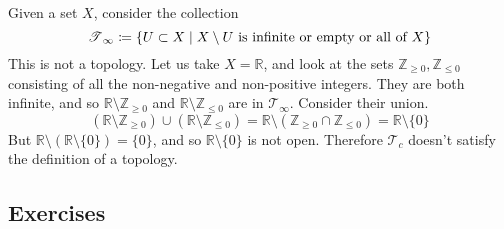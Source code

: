   \begin{example}
    Given a set $X$, consider the collection 
    \begin{equation}
      \T_\infty \coloneqq \{U \subset X \mid X \setminus U \text{ is infinite or empty or all of }X \}
    \end{equation}
    This is not a topology. Let us take $X = \mathbb{R}$, and look at the sets $\mathbb{Z}_{\geq 0}, \mathbb{Z}_{\leq 0}$ consisting of all the non-negative and non-positive integers. They are both infinite, and so $\mathbb{R} \setminus \mathbb{Z}_{\geq 0}$ and $\mathbb{R} \setminus \mathbb{Z}_{\leq 0}$ are in $\mathcal{T}_\infty$. Consider their union. 
    \begin{equation}
      (\mathbb{R} \setminus \mathbb{Z}_{\geq 0}) \cup (\mathbb{R} \setminus \mathbb{Z}_{\leq 0}) = \mathbb{R} \setminus (\mathbb{Z}_{\geq 0} \cap \mathbb{Z}_{\leq 0}) = \mathbb{R} \setminus \{0\}
    \end{equation}
    But $\mathbb{R} \setminus (\mathbb{R} \setminus \{0\}) = \{0\}$, and so $\mathbb{R} \setminus \{0\}$ is not open. Therefore $\mathcal{T}_c$ doesn't satisfy the definition of a topology. 
  \end{example}

\subsection{Exercises}


